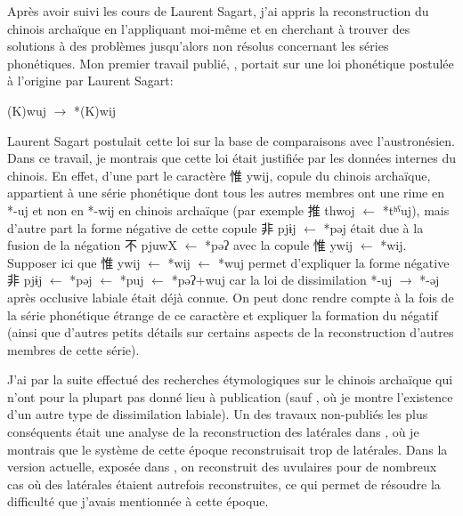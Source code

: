\documentclass[oldfontcommands,oneside,a4paper,11pt]{memoir}
\newcommand{\zh}[1]{{\cn #1}}
\begin{document}
Après avoir suivi les cours de Laurent Sagart, j'ai appris la reconstruction du chinois archaïque en l'appliquant moi-même et en cherchant à trouver des solutions à des problèmes jusqu'alors non résolus concernant les séries phonétiques. Mon premier travail publié, \citet{jacques00ywij}, portait sur une loi phonétique postulée à l'origine par Laurent Sagart:
\begin{exe}
\ex 
\glt *(K)wuj $\rightarrow $ *(K)wij 
\end{exe}
Laurent Sagart postulait cette loi sur la base de comparaisons avec l'austronésien. Dans ce travail, je montrais que cette loi était justifiée par les données internes du chinois. En effet, d'une part le caractère \zh{惟} ywij, copule du chinois archaïque, appartient à une série phonétique dont tous les autres membres ont une rime en *-uj et non en *-wij en chinois archaïque (par exemple \zh{推} thwoj $\leftarrow$ *tʰˁuj), mais d'autre part la forme négative de cette copule \zh{非} pjɨj $\leftarrow$ *pəj était due à la fusion de la négation \zh{不} pjuwX  $\leftarrow$ *pəʔ avec la copule \zh{惟} ywij $\leftarrow$ *wij. Supposer ici que \zh{惟} ywij $\leftarrow$ *wij $\leftarrow$ *wuj permet d'expliquer la forme négative \zh{非} pjɨj $\leftarrow$ *pəj $\leftarrow$ *puj $\leftarrow$ *pəʔ+wuj car la loi de dissimilation *-uj $\rightarrow $ *-əj après occlusive labiale était déjà connue. On peut donc rendre compte à la fois de la série phonétique étrange de ce caractère et expliquer la formation du négatif (ainsi que d'autres petits détails sur certains aspects de la reconstruction  d'autres membres de cette série).

J'ai par la suite effectué des recherches étymologiques sur le chinois archaïque qui n'ont pour la plupart pas donné lieu à publication (sauf \citet{jacques03dissimilation}, où je montre l'existence d'un autre type de dissimilation labiale). Un des travaux non-publiés les plus conséquents était une analyse de  la reconstruction des latérales dans \citet{sagart99roc}, où je montrais que le système de cette époque reconstruisait trop de latérales. Dans la version actuelle, exposée dans \citet{sagart-baxter09}, on reconstruit des uvulaires pour de nombreux cas où des latérales étaient autrefois reconstruites, ce qui permet de résoudre la difficulté que j'avais mentionnée à cette époque.
\end{document}
